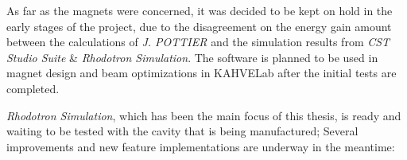 \documentclass[a4paper,oneside,12pt]{report}
\numberwithin{equation}{chapter}
\begin{document}
As far as the magnets were concerned, it was decided to be kept on hold in the early stages of the project, 
due to the disagreement on the energy gain amount between the calculations of \textit{J. POTTIER} \cite{rhodo_pottier} 
and the simulation results from \textit{CST Studio Suite} \& \textit{Rhodotron Simulation}. 
The software is planned to be used in magnet design and beam optimizations in KAHVELab after the initial tests are completed.

\textit{Rhodotron Simulation}, which has been the main focus of this thesis, is ready and waiting to be tested with the cavity that is being manufactured; 
Several improvements and new feature implementations are underway in the meantime:
\iffalse \begin{figure}[H]
    \begin{subfigure}[t]{0.5\textwidth}
        \begin{itemize}
            \item Electric and magnetic field import
            \item Field generator module to directly produce field files from specified cavity
            \item Synchrotron radiation calculations to determine radiation and energy loss
            \item \ee interactions
            \item Redesign of the GUI
            \item 3D render in GUI
        \end{itemize}
    \end{subfigure}
    \begin{subfigure}[t]{0.5\textwidth}
        \begin{itemize}
            \item Refactoring of the \eEM interaction and logging to improve performance
            \item Refactoring of the GUI Render Frame to improve render speed
            \item Refactoring the magnet class to introduce field leaks
            \item Extention of analysis tools in Analyze Frame
            \item $L_{out}$ sweep in Sweep Frame
        \end{itemize}
    \end{subfigure}
\end{figure} \fi
\end{document}
